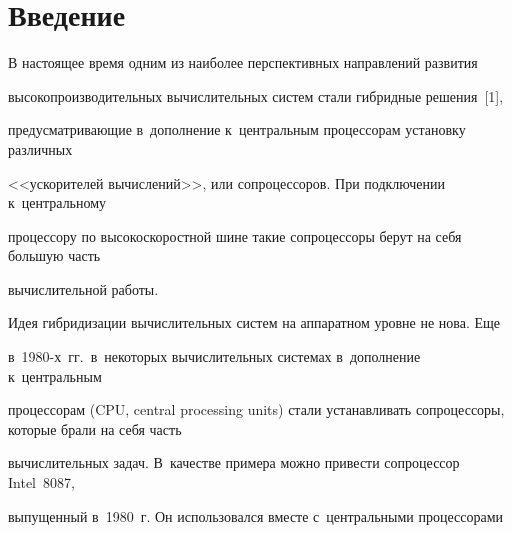       














      \thispagestyle{headings}

      

      \vspace*{-20pt} 

      

\section{Введение}



\vspace*{-3pt}



      В настоящее время одним из наиболее перспективных направлений развития 

высокопроизводительных вычислительных систем стали гибридные решения~[1], 

предусматривающие в~дополнение к~центральным процессорам установку различных 

<<ускорителей вычислений>>, или сопроцессоров. При подключении к~центральному 

процессору по высокоскоростной шине такие сопроцессоры берут на себя большую часть 

вычислительной работы.

      

      Идея гибридизации вычислительных систем на аппаратном уровне не нова. Еще 

в~1980-х~гг.\ в~некоторых вычислительных системах в~дополнение к~центральным 

процессорам (CPU, central processing units) стали устанавливать сопроцессоры, которые брали на себя часть 

вычислительных задач. В~качестве примера можно привести сопроцессор Intel~8087, 

выпущенный в~1980~г. Он использовался вместе с~центральными процессорами 

